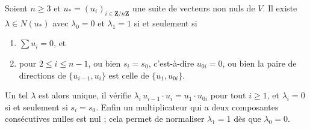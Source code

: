 \begin{encadre}
\begin{theoreme}\label{thm:73-critere}
Soient $n \geq 3$ et $u_* = (u_i)_{i \in \mathbf{Z}/n\mathbf{Z}}$ une suite de vecteurs non nuls de $V$. Il existe $\lambda \in N(u_*)$ avec $\lambda_0 = 0$ et $\lambda_1 = 1$ si et seulement si
\begin{enumerate}
\item[a)] $\sum u_i = 0$, et
\item[b)] pour $2 \leq i \leq n - 1$, ou bien $s_i = s_0$, c'est-à-dire $u_{0i} = 0$, ou bien la paire de directions de $\{u_{i-1}, u_i\}$ est celle de $\{u_1, u_{0i}\}$.
\end{enumerate}
Un tel $\lambda$ est alors unique, il vérifie $\lambda_i\, u_{i-1} \cdot u_i = u_1 \cdot u_{0i}$ pour tout $i \geq 1$, et $\lambda_i = 0$ si et seulement si $s_i = s_0$. Enfin un multiplicateur qui a deux composantes consécutives nulles est nul ; cela permet de normaliser $\lambda_1 = 1$ dès que $\lambda_0 = 0$.
\end{theoreme}
\end{encadre}

